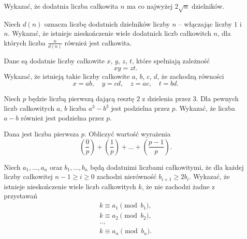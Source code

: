\begin{problem}{1}
	Wykazać, że dodatnia liczba całkowita $n$ ma co najwyżej $2\sqrt{n}$ dzielników.
\end{problem}

\begin{problem}{2}
	Niech $d(n)$ oznacza liczbę dodatnich dzielników liczby $n$ -- włączając liczby $1$ i $n$. Wykazać, że istnieje nieskończenie wiele dodatnich liczb całkowitch $n$, dla których liczba $\frac{n}{d(n)}$ również jest całkowita.
\end{problem}

\begin{problem}{3}
	Dane są dodatnie liczby całkowite $x$, $y$, $z$, $t$, które spełniają zależność 
	\[
		xy = zt.
	\]
	Wykazać, że istnieją takie liczby całkowite $a$, $b$, $c$, $d$, że zachodzą równości
	\[
		x = ab, \quad y = cd, \quad z = ac, \quad t = bd.
	\]
\end{problem}

\begin{problem}{4}
	Niech $p$ będzie liczbą pierwszą dającą resztę $2$ z dzielenia przez $3$. Dla pewnych liczb całkowitych $a$, $b$ liczba $a^3 - b^3$ jest podzielna przez $p$. Wykazać, że liczba $a - b$ również jest podzielna przez $p$.
\end{problem}

\begin{problem}{5}
	Dana jest liczba pierwsza $p$. Obliczyć wartość wyrażenia
	\[
		\left(\frac{0}{p}\right) + 
		\left(\frac{1}{p}\right) + 
		... +
		\left(\frac{p - 1}{p}\right).
	\]
\end{problem}

\begin{problem}{6}
	Niech $a_1, ..., a_n$ oraz $b_1, ..., b_n$ będą dodatnimi liczbami całkowitymi, że dla każdej liczby całkowitej $n - 1\geqslant i \geqslant 0$ zachodzi nierówność $b_{i + 1} \geqslant 2b_{i}$. Wykazać, że istnieje nieskończenie wiele liczb całkowitych $k$, że nie zachodzi żadne z przystawań
	\begin{gather*}
		k \equiv a_1 \pmod{b_1}, \\
		k \equiv a_2 \pmod{b_2}, \\
		.., \\
		k \equiv a_n \pmod{b_n}.
	\end{gather*}
\end{problem}

